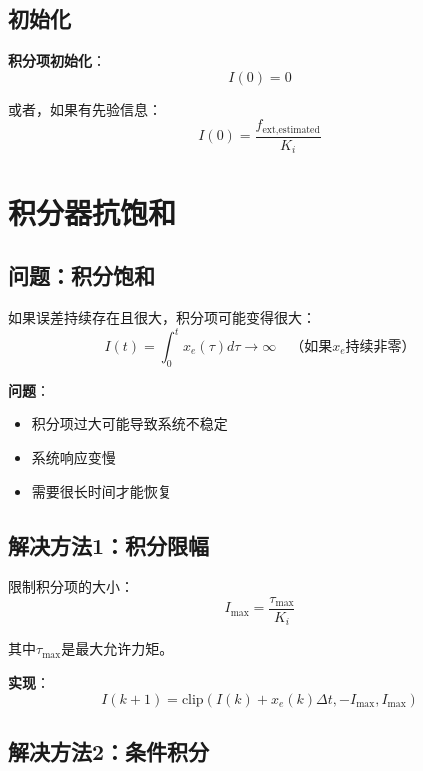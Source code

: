\documentclass[12pt,a4paper]{article}
\begin{document}
\subsection{初始化}

\textbf{积分项初始化}：
\begin{equation}
I(0) = 0
\end{equation}

或者，如果有先验信息：
\begin{equation}
I(0) = \frac{f_{\text{ext,estimated}}}{K_i}
\end{equation}

\section{积分器抗饱和}

\subsection{问题：积分饱和}

如果误差持续存在且很大，积分项可能变得很大：
\begin{equation}
I(t) = \int_0^t x_e(\tau) d\tau \to \infty \quad \text{（如果$x_e$持续非零）}
\end{equation}

\textbf{问题}：
\begin{itemize}
\item 积分项过大可能导致系统不稳定
\item 系统响应变慢
\item 需要很长时间才能恢复
\end{itemize}

\subsection{解决方法1：积分限幅}

限制积分项的大小：
\begin{equation}
I_{\max} = \frac{\tau_{\max}}{K_i}
\end{equation}

其中$\tau_{\max}$是最大允许力矩。

\textbf{实现}：
\begin{equation}
I(k+1) = \text{clip}(I(k) + x_e(k) \Delta t, -I_{\max}, I_{\max})
\end{equation}

\subsection{解决方法2：条件积分}
\end{document}
